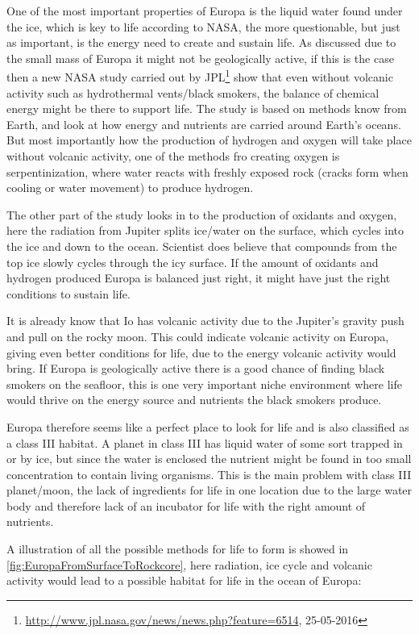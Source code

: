 One of the most important properties of Europa is the liquid water found under the ice, which is key to life according to NASA, the more questionable, but just as important, is the energy need to create and sustain life. As discussed due to the small mass of Europa it might not be geologically active, if this is the case then a new NASA study carried out by JPL\footnote{\url{http://www.jpl.nasa.gov/news/news.php?feature=6514}, 25-05-2016} show that even without volcanic activity such as hydrothermal vents/black smokers, the balance of chemical energy might be there to support life. The study is based on methods know from Earth, and look at how energy and nutrients are carried around Earth's oceans. But most importantly how the production of hydrogen and oxygen will take place without volcanic activity, one of the methods fro creating oxygen is serpentinization, where water reacts with freshly exposed rock (cracks form when cooling or water movement) to produce hydrogen.

The other part of the study looks in to the production of oxidants and oxygen, here the radiation from Jupiter splits ice/water on the surface, which cycles into the ice and down to the ocean. Scientist does believe that compounds from the top ice slowly cycles through the icy surface. If the amount of oxidants and hydrogen produced Europa is balanced just right, it might have just the right conditions to sustain life.

It is already know that Io has volcanic activity due to the Jupiter's gravity push and pull on the rocky moon. This could indicate volcanic activity on Europa, giving even better conditions for life, due to the energy volcanic activity would bring. If Europa is geologically active there is a good chance of finding black smokers on the seafloor, this is one very important niche environment where life would thrive on the energy source and nutrients the black smokers produce.

Europa therefore seems like a perfect place to look for life and is also classified as a class III habitat. A planet in class III has liquid water of some sort trapped in or by ice, but since the water is enclosed the nutrient might be found in too small concentration to contain living organisms. This is the main problem with class III planet/moon, the lack of ingredients for life in one location due to the large water body and therefore lack of an incubator for life with the right amount of nutrients.

A illustration of all the possible methods for life to form is showed in \ref{fig:EuropaFromSurfaceToRockcore}, here radiation, ice cycle and volcanic activity would lead to a possible habitat for life in the ocean of Europa:

